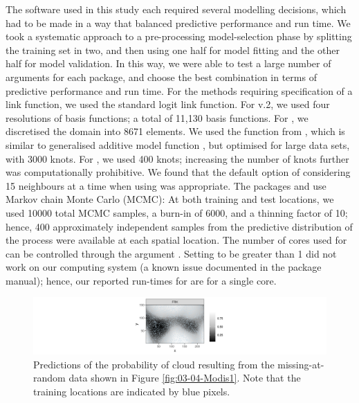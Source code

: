 \documentclass[article]{jss}
\newcommand{\fct}[1]{\code{#1()}}
\begin{document}
The software used in this study each required several modelling decisions, which had to be made in a way that balanced predictive performance and run time. 
 We took a systematic approach to a pre-processing model-selection phase by splitting the training set in two, and then using one half for model fitting and the other half for model validation. 
 In this way, we were able to test a large number of arguments for each package, and choose the best combination in terms of predictive performance and run time.  
 For the methods requiring specification of a link function, we used the standard logit link function.
 For  v.2, we used four resolutions of basis functions; a total of 11,130 basis functions. 
 For , we discretised the domain into 8671 elements.
 We used the \fct{bam} function from , which is similar to generalised additive model function \fct{gam}, but optimised for large data sets, with 3000 knots. 
For , we used 400 knots; increasing the number of knots further was computationally prohibitive. 
 We found that the default option of considering 15 neighbours at a time when using  was appropriate.
 The packages  and  use Markov chain Monte Carlo (MCMC): At both training and test locations, we used 10000 total MCMC samples, a burn-in of 6000, and a thinning factor of 10; hence, 400 approximately independent samples from the predictive distribution of the process were available at each spatial location. 
The number of cores used for  can be controlled through the argument . 
Setting  to be greater than 1 did not work on our computing system (a known issue documented in the  package manual); hence, our reported run-times for  are for a single core.

 
\begin{figure}
    \centering
    \includegraphics[width = \linewidth]{img/MODIS_MAR_predictions.png}
     \caption{Predictions of the probability of cloud resulting from the missing-at-random data shown in Figure \ref{fig:03-04-Modis1}. Note that the training locations are indicated by blue pixels.}   
  \label{fig:MODIS:pred_MR}
\end{figure}
\end{document}
